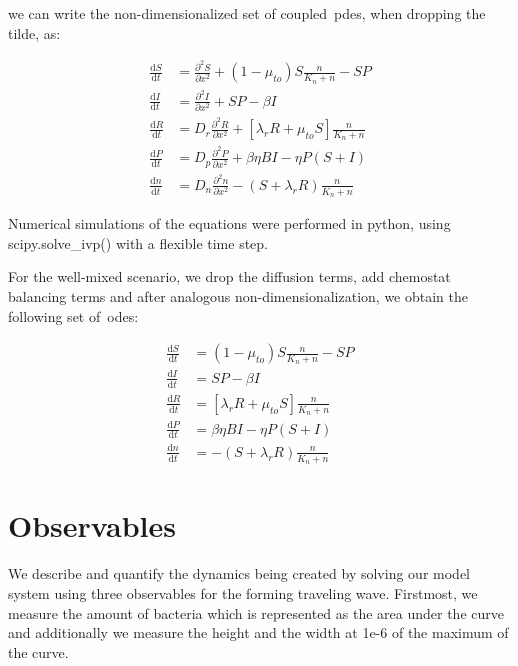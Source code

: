 we can write the non-dimensionalized set of coupled~\gls{pde}s, when dropping the tilde, as:
    
\begin{align}
    \frac{\text{d}S}{\text{d}t} &= \frac{\partial^2S}{\partial x^2} + \left( 1 - \mu_{to} \right) S \frac{n}{K_n+n}  - SP \\
    \frac{\text{d}I}{\text{d}t} &= \frac{\partial^2I}{\partial x^2} + SP - \beta I\\
    \frac{\text{d}R}{\text{d}t} &= D_r \frac{\partial^2R}{\partial x^2} + \left[\lambda_r R + \mu_{to} S \right] \frac{n}{K_n+n}\\
    \frac{\text{d}P}{\text{d}t} &= D_p \frac{\partial^2P}{\partial x^2} + \beta \eta BI - \eta P(S+I) \\
    \frac{\text{d}n}{\text{d}t} &= D_n \frac{\partial^2n}{\partial x^2} - \left( S + \lambda_r R \right) \frac{n}{K_n+n}
\end{align}


Numerical simulations of the equations were performed in python, using scipy.solve_ivp() with a flexible time step.

For the well-mixed scenario, we drop the diffusion terms, add chemostat balancing terms and after analogous non-dimensionalization, we obtain the following set of~\gls{ode}s:

\begin{align}
    \frac{\text{d}S}{\text{d}t} &= \left( 1 - \mu_{to} \right) S \frac{n}{K_n+n}  - SP \\
    \frac{\text{d}I}{\text{d}t} &= SP - \beta I\\
    \frac{\text{d}R}{\text{d}t} &= \left[\lambda_r R + \mu_{to} S \right] \frac{n}{K_n+n}\\
    \frac{\text{d}P}{\text{d}t} &= \beta \eta BI - \eta P(S+I) \\
    \frac{\text{d}n}{\text{d}t} &= - \left( S + \lambda_r R \right) \frac{n}{K_n+n}
\end{align}

\section{Observables}

We describe and quantify the dynamics being created by solving our model system using three observables for the forming traveling wave. Firstmost, we measure the amount of bacteria which is represented as the area under the curve and additionally we measure the height and the width at 1e-6 of the maximum of the curve.
